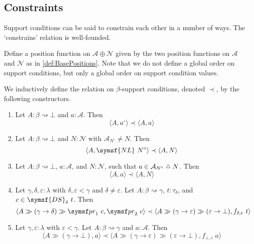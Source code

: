 \subsection{Constraints}

Support conditions can be said to constrain each other in a number of ways.
The `constrains' relation is well-founded.

\begin{definition}
    Define a position function on \( \mathcal A \oplus \mathcal N \) given by the two position functions on \( \mathcal A \) and \( \mathcal N \) as in \cref{def:BasePositions}.
    Note that we do not define a global order on support conditions, but only a global order on support condition values.
\end{definition}
\begin{definition}
    \label{def:Constrains}
    We inductively define the  relation on \( \beta \)-support conditions, denoted \( \prec \), by the following constructors.
    \begin{enumerate}
        \item Let \( A : \beta \rightsquigarrow \bot \) and \( a : \mathcal A \).
        Then
        \[ \langle A, a^\circ \rangle \prec \langle A, a \rangle \]
        \item Let \( A : \beta \rightsquigarrow \bot \) and \( N : \mathcal N \) with \( \mathcal A_{N^\circ} \neq N \).
        Then
        \[ \langle A, \symsf{NL}\ N^\circ \rangle \prec \langle A, N \rangle \]
        \item Let \( A : \beta \rightsquigarrow \bot \), \( a : \mathcal A \), and \( N : \mathcal N \), such that \( a \in \mathcal A_{N^\circ} \symmdiff N \).
        Then
        \[ \langle A, a \rangle \prec \langle A, N \rangle \]
        \item Let \( \gamma, \delta, \varepsilon : \lambda \) with \( \delta, \varepsilon < \gamma \) and \( \delta \neq \varepsilon \).
        Let \( A : \beta \rightsquigarrow \gamma \), \( t : \tau_\delta \), and \( c \in \symsf{DS}_\delta\ t \).
        Then
        \[ \langle A \gg (\gamma \to \delta) \gg \pr_1\ c, \pr_2\ c \rangle \prec \langle A \gg (\gamma \to \varepsilon) \gg (\varepsilon \to \bot), f_{\delta, \varepsilon}\ t \rangle \]
        \item Let \( \gamma, \varepsilon : \lambda \) with \( \varepsilon < \gamma \).
        Let \( A : \beta \rightsquigarrow \gamma \) and \( a : \mathcal A \).
        Then
        \[ \langle A \gg (\gamma \to \bot), a \rangle \prec \langle A \gg (\gamma \to \varepsilon) \gg (\varepsilon \to \bot), f_{\bot, \varepsilon}\ a \rangle \]
    \end{enumerate}
\end{definition}
